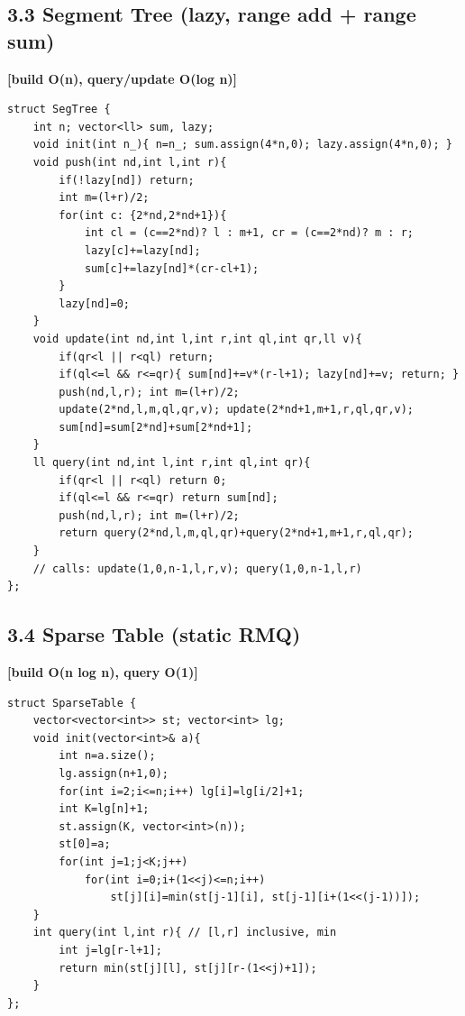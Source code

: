 \documentclass[11pt]{extarticle}
\newcommand{\comp}[1]{\textbf{[#1]}\\}
\begin{document}
\subsection*{3.3 Segment Tree (lazy, range add + range sum)}
\comp{build O(n), query/update O(log n)}
\begin{lstlisting}
struct SegTree {
    int n; vector<ll> sum, lazy;
    void init(int n_){ n=n_; sum.assign(4*n,0); lazy.assign(4*n,0); }
    void push(int nd,int l,int r){
        if(!lazy[nd]) return;
        int m=(l+r)/2;
        for(int c: {2*nd,2*nd+1}){
            int cl = (c==2*nd)? l : m+1, cr = (c==2*nd)? m : r;
            lazy[c]+=lazy[nd];
            sum[c]+=lazy[nd]*(cr-cl+1);
        }
        lazy[nd]=0;
    }
    void update(int nd,int l,int r,int ql,int qr,ll v){
        if(qr<l || r<ql) return;
        if(ql<=l && r<=qr){ sum[nd]+=v*(r-l+1); lazy[nd]+=v; return; }
        push(nd,l,r); int m=(l+r)/2;
        update(2*nd,l,m,ql,qr,v); update(2*nd+1,m+1,r,ql,qr,v);
        sum[nd]=sum[2*nd]+sum[2*nd+1];
    }
    ll query(int nd,int l,int r,int ql,int qr){
        if(qr<l || r<ql) return 0;
        if(ql<=l && r<=qr) return sum[nd];
        push(nd,l,r); int m=(l+r)/2;
        return query(2*nd,l,m,ql,qr)+query(2*nd+1,m+1,r,ql,qr);
    }
    // calls: update(1,0,n-1,l,r,v); query(1,0,n-1,l,r)
};
\end{lstlisting}

\subsection*{3.4 Sparse Table (static RMQ)}
\comp{build O(n log n), query O(1)}
\begin{lstlisting}
struct SparseTable {
    vector<vector<int>> st; vector<int> lg;
    void init(vector<int>& a){
        int n=a.size();
        lg.assign(n+1,0);
        for(int i=2;i<=n;i++) lg[i]=lg[i/2]+1;
        int K=lg[n]+1;
        st.assign(K, vector<int>(n));
        st[0]=a;
        for(int j=1;j<K;j++)
            for(int i=0;i+(1<<j)<=n;i++)
                st[j][i]=min(st[j-1][i], st[j-1][i+(1<<(j-1))]);
    }
    int query(int l,int r){ // [l,r] inclusive, min
        int j=lg[r-l+1];
        return min(st[j][l], st[j][r-(1<<j)+1]);
    }
};
\end{lstlisting}
\end{document}
